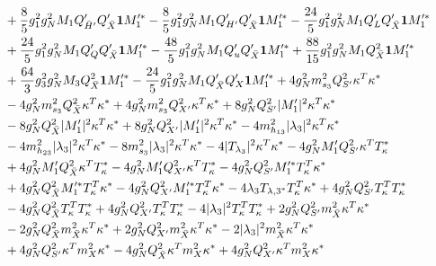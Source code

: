 {\begin{align}
 &+\frac{8}{5} g_{1}^{2} g_{N}^{2} M_1 Q_{\bar{H}'}' Q_{\bar{X}}' {\bf 1} M_1'^* -\frac{8}{5} g_{1}^{2} g_{N}^{2} M_1 Q_{H'}' Q_{\bar{X}}' {\bf 1} M_1'^* -\frac{24}{5} g_{1}^{2} g_{N}^{2} M_1 Q_L' Q_{\bar{X}}' {\bf 1} M_1'^* \nonumber \\ 
 &+\frac{24}{5} g_{1}^{2} g_{N}^{2} M_1 Q_Q' Q_{\bar{X}}' {\bf 1} M_1'^* -\frac{48}{5} g_{1}^{2} g_{N}^{2} M_1 Q_u' Q_{\bar{X}}' {\bf 1} M_1'^* +\frac{88}{15} g_{1}^{2} g_{N}^{2} M_1 Q_{\bar{X}}^{2} {\bf 1} M_1'^* \nonumber \\ 
 &+\frac{64}{3} g_{3}^{2} g_{N}^{2} M_3 Q_{\bar{X}}^{2} {\bf 1} M_1'^* -\frac{24}{5} g_{1}^{2} g_{N}^{2} M_1 Q_{\bar{X}}' Q_X' {\bf 1} M_1'^* +4 g_{N}^{2} m_{s_3}^2 Q_{S'}^{2} {\kappa^{T}  \kappa^*} \nonumber \\ 
 &-4 g_{N}^{2} m_{s_3}^2 Q_{\bar{X}}^{2} {\kappa^{T}  \kappa^*} +4 g_{N}^{2} m_{s_3}^2 Q_{X'}^{2} {\kappa^{T}  \kappa^*} +8 g_{N}^{2} Q_{S'}^{2} |M_1'|^2 {\kappa^{T}  \kappa^*} \nonumber \\ 
 &-8 g_{N}^{2} Q_{\bar{X}}^{2} |M_1'|^2 {\kappa^{T}  \kappa^*} +8 g_{N}^{2} Q_{X'}^{2} |M_1'|^2 {\kappa^{T}  \kappa^*} -4 m_{h_{13}}^2 |\lambda_3|^2 {\kappa^{T}  \kappa^*} \nonumber \\ 
 &-4 m_{h_{23}}^2 |\lambda_3|^2 {\kappa^{T}  \kappa^*} -8 m_{s_3}^2 |\lambda_3|^2 {\kappa^{T}  \kappa^*} -4 |T_{\lambda_3}|^2 {\kappa^{T}  \kappa^*} -4 g_{N}^{2} M_1' Q_{S'}^{2} {\kappa^{T}  T_{\kappa}^*} \nonumber \\ 
 &+4 g_{N}^{2} M_1' Q_{\bar{X}}^{2} {\kappa^{T}  T_{\kappa}^*} -4 g_{N}^{2} M_1' Q_{X'}^{2} {\kappa^{T}  T_{\kappa}^*} -4 g_{N}^{2} Q_{S'}^{2} M_1'^* {T_{\kappa}^{T}  \kappa^*} \nonumber \\ 
 &+4 g_{N}^{2} Q_{\bar{X}}^{2} M_1'^* {T_{\kappa}^{T}  \kappa^*} -4 g_{N}^{2} Q_{X'}^{2} M_1'^* {T_{\kappa}^{T}  \kappa^*} -4 \lambda_3 T_{{\lambda,3}^*} {T_{\kappa}^{T}  \kappa^*} +4 g_{N}^{2} Q_{S'}^{2} {T_{\kappa}^{T}  T_{\kappa}^*} \nonumber \\ 
 &-4 g_{N}^{2} Q_{\bar{X}}^{2} {T_{\kappa}^{T}  T_{\kappa}^*} +4 g_{N}^{2} Q_{X'}^{2} {T_{\kappa}^{T}  T_{\kappa}^*} -4 |\lambda_3|^2 {T_{\kappa}^{T}  T_{\kappa}^*} +2 g_{N}^{2} Q_{S'}^{2} {m_{\bar{X}}^2  \kappa^{T}  \kappa^*} \nonumber \\ 
 &-2 g_{N}^{2} Q_{\bar{X}}^{2} {m_{\bar{X}}^2  \kappa^{T}  \kappa^*} +2 g_{N}^{2} Q_{X'}^{2} {m_{\bar{X}}^2  \kappa^{T}  \kappa^*} -2 |\lambda_3|^2 {m_{\bar{X}}^2  \kappa^{T}  \kappa^*} \nonumber \\ 
 &+4 g_{N}^{2} Q_{S'}^{2} {\kappa^{T}  m_{X}^2  \kappa^*} -4 g_{N}^{2} Q_{\bar{X}}^{2} {\kappa^{T}  m_{X}^2  \kappa^*} +4 g_{N}^{2} Q_{X'}^{2} {\kappa^{T}  m_{X}^2  \kappa^*} \nonumber \\ 

\end{align}}
